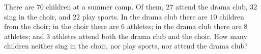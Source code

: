 There are $70$ children at a summer camp. Of them, $27$ attend the drama club, $32$ sing in the choir, and $22$ play sports. In the drama club there are $10$ children from the choir; in the choir there are $6$ athletes; in the drama club there are $8$ athletes; and $3$ athletes attend both the drama club and the choir. How many children neither sing in the choir, nor play sports, nor attend the drama club?

